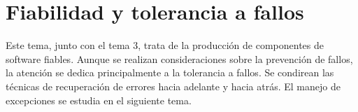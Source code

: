 \section{Fiabilidad y tolerancia a fallos}

Este tema, junto con el tema 3, trata de la producción de componentes de
software fiables. Aunque se realizan consideraciones sobre la prevención de
fallos, la atención se dedica principalmente a la tolerancia a fallos. Se
condirean las técnicas de recuperación de errores hacia adelante y hacia atrás.
El manejo de excepciones se estudia en el siguiente tema.
